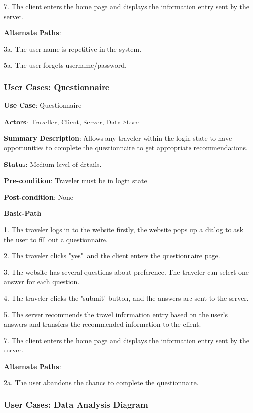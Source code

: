 \documentclass[conference]{IEEEtran}
\begin{document}
7. The client enters the home page and displays the information entry sent by the server.

\textbf{Alternate Paths}:

3a. The user name is repetitive in the system.

5a. The user forgets username/password.


\subsubsection{User Cases: Questionnaire}

\textbf{ }

\textbf{Use Case}: Questionnaire

\textbf{Actors}: Traveller, Client, Server, Data Store.

\textbf{Summary Description}: Allows any traveler within the login state to have opportunities to complete the questionnaire to get appropriate recommendations.
 
\textbf{Status}: Medium level of details.

\textbf{Pre-condition}: Traveler must be in login state.

\textbf{Post-condition}: None

\textbf{Basic-Path}:

1. The traveler logs in to the website firstly, the website pops up a dialog to ask the user to fill out a questionnaire.

2. The traveler clicks "yes", and the client enters the questionnaire page.

3. The website has several questions about preference. The traveler can select one answer for each question.

4. The traveler clicks the "submit" button, and the answers are sent to the server.

5. The server recommends the travel information entry based on the user's answers and transfers the recommended information to the client.

7. The client enters the home page and displays the information entry sent by the server.

\textbf{Alternate Paths}:

2a. The user abandons the chance to complete the questionnaire.


\subsubsection{User Cases: Data Analysis Diagram}
\end{document}
